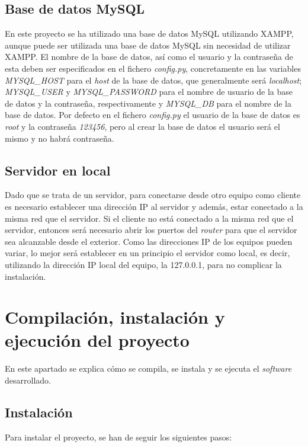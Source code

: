 \subsection{Base de datos MySQL}
En este proyecto se ha utilizado una base de datos MySQL utilizando XAMPP, aunque puede ser utilizada una base de datos MySQL sin necesidad de utilizar XAMPP. El nombre de la base de datos, así como el usuario y la contraseña de esta deben ser especificados en el fichero \textit{config.py}, concretamente en las variables \textit{MYSQL\_HOST} para el \textit{host} de la base de datos, que generalmente será \textit{localhost}; \textit{MYSQL\_USER} y \textit{MYSQL\_PASSWORD} para el nombre de usuario de la base de datos y la contraseña, respectivamente y \textit{MYSQL\_DB} para el nombre de la base de datos. Por defecto en el fichero \textit{config.py} el usuario de la base de datos es \textit{root} y la contraseña \textit{123456}, pero al crear la base de datos el usuario será el mismo y no habrá contraseña.

\subsection{Servidor en local}
Dado que se trata de un servidor, para conectarse desde otro equipo como cliente es necesario establecer una dirección IP al servidor y además, estar conectado a la misma red que el servidor. Si el cliente no está conectado a la misma red que el servidor, entonces será necesario abrir los puertos del \textit{router} para que el servidor sea alcanzable desde el exterior. Como las direcciones IP de los equipos pueden variar, lo mejor será establecer en un principio el servidor como local, es decir, utilizando la dirección IP local del equipo, la 127.0.0.1, para no complicar la instalación.

\section{Compilación, instalación y ejecución del proyecto}
En este apartado se explica cómo se compila, se instala y se ejecuta el \textit{software} desarrollado.

\subsection{Instalación}
Para instalar el proyecto, se han de seguir los siguientes pasos:

